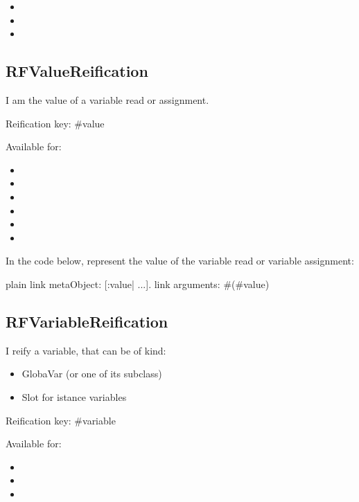 \documentclass[10pt,twoside,english]{_support/latex/sbabook/sbabook}
\begin{document}
\begin{itemize}
\item {}
\item {}
\item {}
\end{itemize}
\subsection{RFValueReification}
I am the value of a variable read or assignment.

Reification key: \#value

Available for:

\begin{itemize}
\item {}
\item {}
\item {}
\item {}
\item {}
\item {}
\end{itemize}

In the code below,  represent the value of the variable read or variable assignment:

\begin{displaycode}{plain}
link metaObject: [:value| ...].
link arguments: #(#value)
\end{displaycode}
\subsection{RFVariableReification}
I reify a variable, that can be of kind:

\begin{itemize}
\item GlobaVar (or one of its subclass) 
\item Slot for istance variables 
\end{itemize}

Reification key: \#variable

Available for:

\begin{itemize}
\item {}
\item {}
\item {}
\end{itemize}
\end{document}
